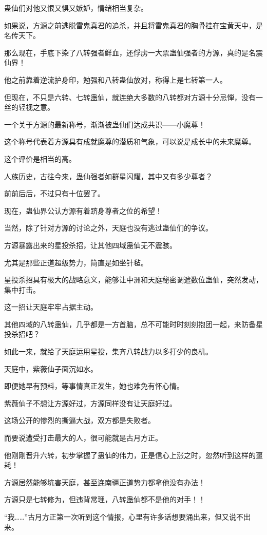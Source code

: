 \begin{this_body}
蛊仙们对他又恨又惧又嫉妒，情绪相当复杂。

如果说，方源之前逃脱雷鬼真君的追杀，并且将雷鬼真君的胸骨挂在宝黄天中，是名传天下。

那么现在，手底下染了八转强者鲜血，还俘虏一大票蛊仙强者的方源，真的是名震仙界！

他之前靠着逆流护身印，勉强和八转蛊仙放对，称得上是七转第一人。

但现在，不只是六转、七转蛊仙，就连绝大多数的八转都对方源十分忌惮，没有一丝的轻视之意。

一个关于方源的最新称号，渐渐被蛊仙们达成共识——小魔尊！

这个称号代表着方源具有成就魔尊的潜质和气象，可以说是成长中的未来魔尊。

这个评价是相当的高。

人族历史，古往今来，蛊仙强者如群星闪耀，其中又有多少尊者？

前前后后，不过只有十位罢了。

现在，蛊仙界公认方源有着跻身尊者之位的希望！

当然，除了针对方源的讨论之外，天庭也没有逃过蛊仙们的争议。

方源暴露出来的星投杀招，让其他四域蛊仙无不震骇。

尤其是那些正道超级势力，简直是如坐针毡。

星投杀招具有极大的战略意义，能够让中洲和天庭秘密调遣数位蛊仙，突然发动，集中打击。

这一招让天庭牢牢占据主动。

其他四域的八转蛊仙，几乎都是一方首脑，总不可能时时刻刻抱团一起，来防备星投杀招吧？

如此一来，就给了天庭运用星投，集齐八转战力以多打少的良机。

天庭中，紫薇仙子面沉如水。

即便她早有预料，等事情真正发生，她也难免有怀心情。

紫薇仙子不想让方源好过，方源同样没有让天庭好过。

这场公开的惨烈的撕逼大战，双方都是失败者。

而要说遭受打击最大的人，很可能就是古月方正。

他刚刚晋升六转，初步掌握了蛊仙的伟力，正是信心上涨之时，忽然听到这样的噩耗！

方源居然能够坑害天庭，甚至连南疆正道势力都拿他没有办法！

方源只是七转修为，但违背常理，八转蛊仙都不是他的对手！！

“我……”古月方正第一次听到这个情报，心里有许多话想要涌出来，但又说不出来。


\end{this_body}
